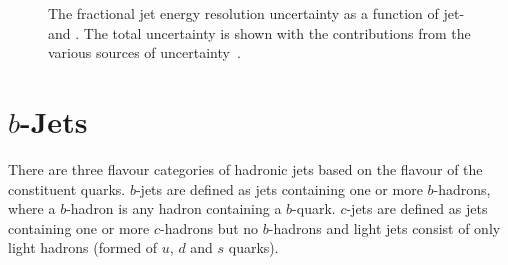 \begin{figure}[!htb]
\begin{center}
 \end{center}
 \vspace{-1em}
  \caption[The fractional jet energy resolution uncertainty as a function of jet-\pT{} and \eta.]
          {\label{fig:obj-jets_calib_JER} The fractional jet energy resolution uncertainty as a function of jet-\pT{} and \eta.
            The total uncertainty is shown with the contributions from the various sources of uncertainty~\cite{obj-jets_calib_2015}.}
\end{figure}

\FloatBarrier

\section{$b$-Jets}
\label{sec:obj-bjets}

There are three flavour categories of hadronic jets based on the flavour of the constituent quarks.
$b$-jets are defined as jets containing one or more $b$-hadrons, where a $b$-hadron is any hadron containing a $b$-quark.
$c$-jets are defined as jets containing one or more $c$-hadrons but no $b$-hadrons
and light jets consist of only light hadrons (formed of $u$, $d$ and $s$ quarks).

